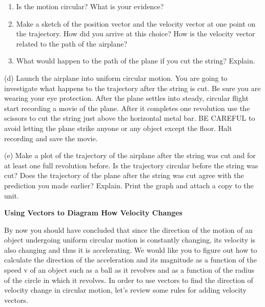 \begin{enumerate}
\item Is the motion circular? What is your evidence?\vspace{10mm}

\item Make a sketch of the position vector and the velocity vector at one point on
the trajectory. How did you arrive at this choice? How is the velocity vector
related to the path of the airplane?\vspace{30mm}

\item What would happen to the path of the plane if you cut the string? Explain.\vspace{20mm}

\end{enumerate}

\newpage
(d) Launch the airplane into uniform circular motion. You are going to investigate
what happens to the trajectory after the string is cut. Be sure you are wearing
your eye protection. After the plane settles into steady, circular flight start
recording a movie of the plane. After it completes one revolution use the scissors
to cut the string just above the horizontal metal bar. BE CAREFUL to avoid letting
the plane strike anyone or any object except the floor. Halt recording and save
the movie.

(e) Make a plot of the trajectory of the airplane after the string was cut and
for at least one full revolution before. Is the trajectory circular before the
string was cut? Does the trajectory of the plane after the string was cut agree
with the prediction you made earlier? Explain. Print the graph and attach a
copy to the unit.
\vspace{20mm}

\textbf{Using Vectors to Diagram How Velocity Changes} 

By now you should have concluded that since the direction of the motion of an
object undergoing uniform circular motion is constantly changing, its velocity
is also changing and thus it is accelerating. We would like you to figure out
how to calculate the direction of the acceleration and its magnitude as a function
of the speed v of an object such as a ball as it revolves and as a function
of the radius of the circle in which it revolves. In order to use vectors to
find the direction of velocity change in circular motion, let's review some
rules for adding velocity vectors.


